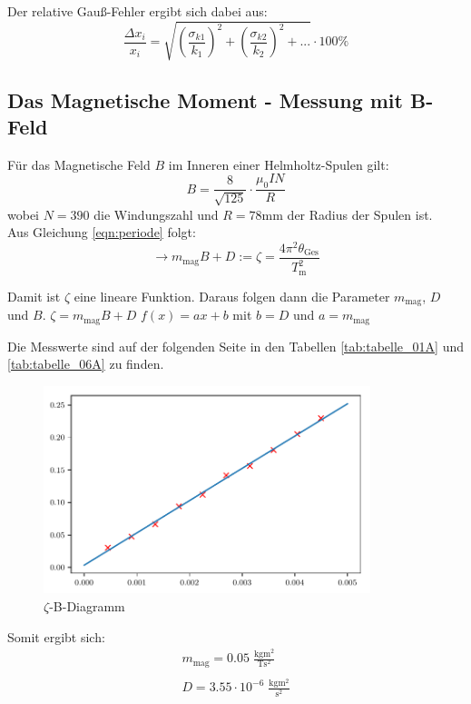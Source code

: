 Der relative Gauß-Fehler ergibt sich dabei aus:
\begin{equation}
    \frac{\Delta x_i}{x_i}=\sqrt{(\frac{\sigma_{k1}}{k_1})^2+(\frac{\sigma_{k2}}{k_2})^2+...} \cdot 100\%
    \label{eqn:relfehler}
\end{equation}

\newpage
\subsection{Das Magnetische Moment - Messung mit B-Feld}

Für das Magnetische Feld $B$ im Inneren einer Helmholtz-Spulen gilt:
\begin{equation}
    B= \frac{8}{\sqrt{125}} \cdot \frac{\mu_0 I N}{R}
\end{equation}
wobei $N=390$ die Windungszahl und $R=78$mm der Radius der Spulen ist.\\
Aus Gleichung \ref{eqn:periode}
folgt:
\begin{equation}
    \to m_\text{mag}B+D := \zeta = \frac{4\pi^2\theta_\text{Ges}}{T^2_\text{m}}
\end{equation}

Damit ist $\zeta$ eine lineare Funktion. Daraus folgen dann die Parameter $m_\text{mag}$, $D$ und $B$.\newline
$\zeta = m_\text{mag}B + D$ \to $f(x)=ax+b$ mit $b = D$ und $a=m_\text{mag}$

Die Messwerte sind auf der folgenden Seite in den Tabellen \ref{tab:tabelle_01A} und \ref{tab:tabelle_06A}
zu finden.
\begin{figure}[h]
    \centering
    \includegraphics[width=0.85\textwidth, height=0.5\textwidth]{build/plot.pdf}
    \caption{$\zeta$-B-Diagramm}        
    \label{fig:Diagramm}
\end{figure}

Somit ergibt sich:
\begin{gather*}
    m_\text{mag} = 0.05 \;\mathrm{\frac{kgm^2}{Ts^2}}\\\\
    D = 3.55\cdot10^{-6} \;\mathrm{\frac{kgm^2}{s^2}}
\end{gather*}

